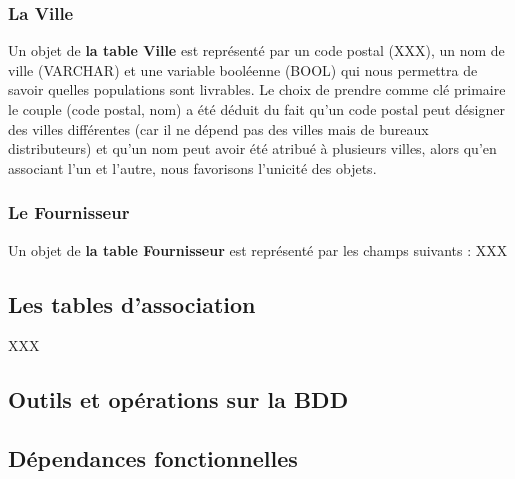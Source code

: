 \documentclass[a4paper, 12pt]{report}
\begin{document}
\begin{spacing}{1.2}
\textcolor{colortitre3}{\subsubsection*{La Ville}}
Un objet de \textbf{la table Ville} est représenté par un code postal (XXX), un nom de ville (VARCHAR) et une variable booléenne (BOOL) qui nous permettra de savoir quelles populations sont livrables. Le choix de prendre comme clé primaire le couple (code postal, nom) a été déduit du fait qu'un code postal peut désigner des villes différentes (car il ne dépend pas des villes mais de bureaux distributeurs) et qu'un nom peut avoir été atribué à plusieurs villes, alors qu'en associant l'un et l'autre, nous favorisons l'unicité des objets.

\textcolor{colortitre3}{\subsubsection*{Le Fournisseur}}
Un objet de \textbf{la table Fournisseur} est représenté par les champs suivants :
XXX


\textcolor{colortitre2}{\subsection*{Les tables d'association}}
XXX



\newpage
\textcolor{colortitre1}{\section*{Outils et opérations sur la BDD}} 


\textcolor{colortitre2}{\subsection*{Dépendances fonctionnelles}} 


\end{spacing}
\end{document}
